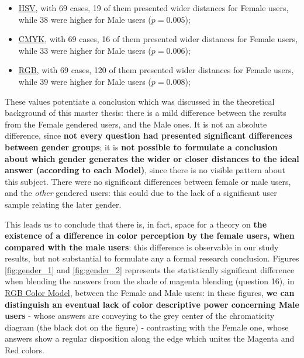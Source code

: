 \begin{enumerate}
    \begin{itemize}
      \item \ul{HSV}, with 69 cases, 19 of them presented wider distances for Female users, while 38 were higher for Male users ($p = 0.005$);
      \item \ul{CMYK}, with 69 cases, 16 of them presented wider distances for Female users, while 33 were higher for Male users ($p = 0.006$);
      \item \ul{RGB}, with 69 cases, 120 of them presented wider distances for Female users, while 39 were higher for Male users ($p = 0.008$);
    \end{itemize}
\end{enumerate} \par
%
These values potentiate a conclusion which was discussed in the theoretical background of this master thesis: there is a mild difference between the results from the Female gendered users, and the Male ones. It is not an absolute difference, since \textbf{not every question had presented significant
differences between gender groups}; it is \textbf{not possible to formulate a conclusion about which gender generates the wider or closer distances to the ideal answer (according to each Model)}, since there is no visible pattern about this subject. There were no significant differences between female
or male users, and the \emph{other} gendered users: this could due to the lack of a significant user sample relating the later gender. \par
%
This leads us to conclude that there is, in fact, space for a theory on \textbf{the existence of a difference in color perception by the female users, when compared with the male users}: this difference is observable in our study results, but not substantial to formulate any a formal research conclusion.
Figures \ref{fig:gender_1} and \ref{fig:gender_2} represents the statistically significant difference when blending the answers from the shade of magenta blending (question 16), in \ul{RGB Color Model}, between the Female and Male users: in these figures, \textbf{we can distinguish an eventual lack of color
descriptive power concerning Male users} - whose answers are conveying to the grey center of the chromaticity diagram (the black dot on the figure) - contrasting with the Female one, whose answers show a regular disposition along the edge which unites the Magenta and Red colors.
%
